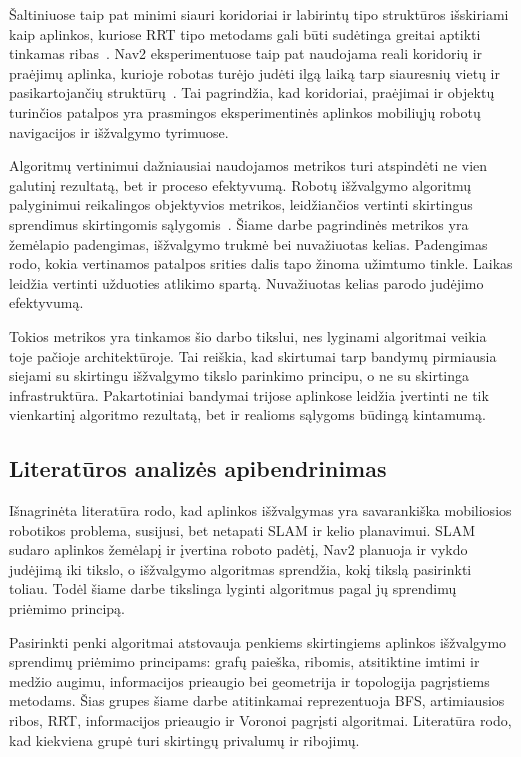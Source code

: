 \documentclass[]{VUMIFTemplateClass}
\begin{document}
Šaltiniuose taip pat minimi siauri koridoriai ir labirintų tipo struktūros išskiriami kaip aplinkos, kuriose RRT tipo metodams gali būti sudėtinga greitai aptikti
tinkamas ribas~\cite{chen2022gvd}. Nav2 eksperimentuose taip pat naudojama reali koridorių ir praėjimų aplinka, kurioje robotas turėjo judėti
ilgą laiką tarp siauresnių vietų ir pasikartojančių struktūrų~\cite{Nav2-Navigation}. Tai pagrindžia, kad koridoriai, praėjimai ir objektų
turinčios patalpos yra prasmingos eksperimentinės aplinkos mobiliųjų robotų navigacijos ir išžvalgymo tyrimuose.

Algoritmų vertinimui dažniausiai naudojamos metrikos turi atspindėti ne vien galutinį rezultatą, bet ir proceso efektyvumą. Robotų
išžvalgymo algoritmų palyginimui reikalingos objektyvios metrikos, leidžiančios vertinti skirtingus sprendimus skirtingomis sąlygomis~\cite{yan2015metrics}.
Šiame darbe pagrindinės metrikos yra žemėlapio padengimas, išžvalgymo trukmė bei nuvažiuotas kelias. Padengimas rodo, kokia
vertinamos patalpos srities dalis tapo žinoma užimtumo tinkle. Laikas leidžia vertinti užduoties atlikimo spartą. Nuvažiuotas kelias parodo judėjimo efektyvumą.

Tokios metrikos yra tinkamos šio darbo tikslui, nes lyginami algoritmai veikia toje pačioje architektūroje. Tai reiškia, kad skirtumai tarp
bandymų pirmiausia siejami su skirtingu išžvalgymo tikslo parinkimo principu, o ne su skirtinga infrastruktūra. Pakartotiniai bandymai trijose
aplinkose leidžia įvertinti ne tik vienkartinį algoritmo rezultatą, bet ir realioms sąlygoms būdingą kintamumą.

\subsection{Literatūros analizės apibendrinimas}

Išnagrinėta literatūra rodo, kad aplinkos išžvalgymas yra savarankiška mobiliosios robotikos problema, susijusi, bet netapati SLAM ir kelio planavimui. SLAM
sudaro aplinkos žemėlapį ir įvertina roboto padėtį, Nav2 planuoja ir vykdo judėjimą iki tikslo, o išžvalgymo algoritmas sprendžia, kokį tikslą pasirinkti
toliau. Todėl šiame darbe tikslinga lyginti algoritmus pagal jų sprendimų priėmimo principą.

Pasirinkti penki algoritmai atstovauja penkiems skirtingiems aplinkos išžvalgymo sprendimų priėmimo principams: grafų paieška, ribomis, atsitiktine imtimi ir medžio augimu, informacijos prieaugio bei geometrija ir topologija pagrįstiems metodams. Šias
grupes šiame darbe atitinkamai reprezentuoja BFS, artimiausios ribos, RRT, informacijos prieaugio ir Voronoi pagrįsti algoritmai. Literatūra rodo, kad
kiekviena grupė turi skirtingų privalumų ir ribojimų.
\end{document}
